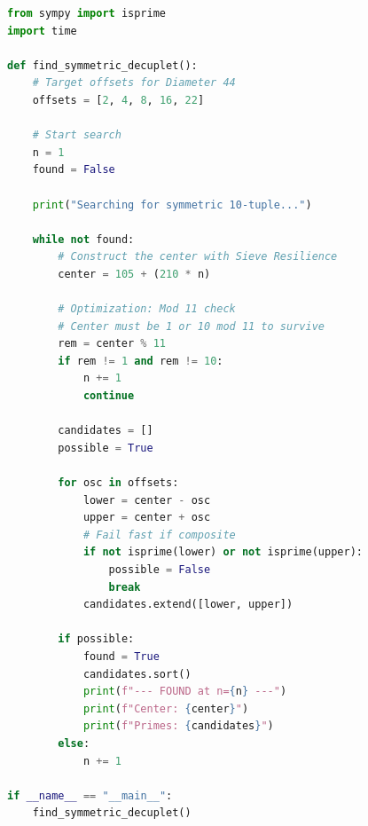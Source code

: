 \documentclass[sn-mathphys-num, pdflatex]{sn-jnl}
\begin{document}
\begin{lstlisting}[language=Python]
from sympy import isprime
import time

def find_symmetric_decuplet():
    # Target offsets for Diameter 44
    offsets = [2, 4, 8, 16, 22]
    
    # Start search
    n = 1
    found = False
    
    print("Searching for symmetric 10-tuple...")
    
    while not found:
        # Construct the center with Sieve Resilience
        center = 105 + (210 * n)
        
        # Optimization: Mod 11 check
        # Center must be 1 or 10 mod 11 to survive
        rem = center % 11
        if rem != 1 and rem != 10:
            n += 1
            continue

        candidates = []
        possible = True
        
        for osc in offsets:
            lower = center - osc
            upper = center + osc
            # Fail fast if composite
            if not isprime(lower) or not isprime(upper):
                possible = False
                break
            candidates.extend([lower, upper])
        
        if possible:
            found = True
            candidates.sort()
            print(f"--- FOUND at n={n} ---")
            print(f"Center: {center}")
            print(f"Primes: {candidates}")
        else:
            n += 1

if __name__ == "__main__":
    find_symmetric_decuplet()
\end{lstlisting}
\end{document}
